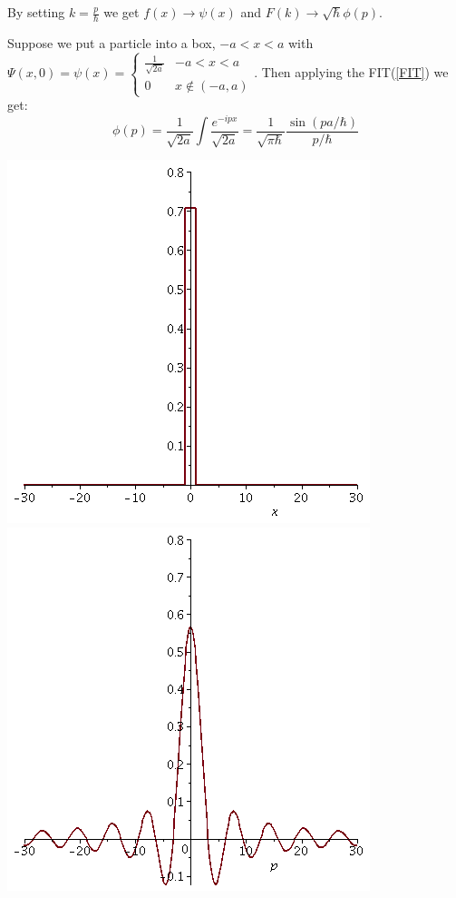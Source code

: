 \documentclass[11pt]{article}
\newcommand{\FR}[2]{\frac{#1}{#2}}
\theoremstyle{plain}
\theoremstyle{definition}
\theoremstyle{remark}
\begin{document}
By setting $k = \FR{p}{\hbar}$ we get $f(x) \to \psi(x)$ and 
$F(k) \to \sqrt{\hbar}\phi(p)$.

Suppose we put a particle into a box, $-a < x < a$ with
$\Psi(x,0) = \psi(x) = \begin{cases} \FR{1}{\sqrt{2a}} &-a<x<a\\ 0 & x\not\in(-a,a)
\end{cases}$. Then applying the FIT(\ref{FIT}) we get:
\[\phi(p) = \FR{1}{\sqrt{2a}}\int \FR{e^{-ipx}}{\sqrt{2a}}
          = \FR{1}{\sqrt{\pi\hbar}} \FR{\sin(pa/\hbar)}{p/\hbar}\]
\begin{center}
\includegraphics[scale=0.25]{posn_repn}
\includegraphics[scale=0.25]{mnt_repn}\end{center}
\end{document}

